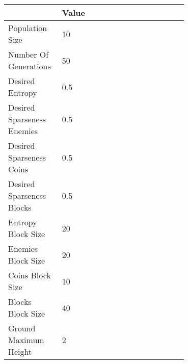 \begin{tabular}{lp{0.7\linewidth}}
\toprule
{} & Value \\
\midrule
Population Size            &    10 \\
Number Of Generations      &    50 \\
Desired Entropy            &   0.5 \\
Desired Sparseness Enemies &   0.5 \\
Desired Sparseness Coins   &   0.5 \\
Desired Sparseness Blocks  &   0.5 \\
Entropy Block Size         &    20 \\
Enemies Block Size         &    20 \\
Coins Block Size           &    10 \\
Blocks Block Size          &    40 \\
Ground Maximum Height      &     2 \\
\bottomrule
\end{tabular}
